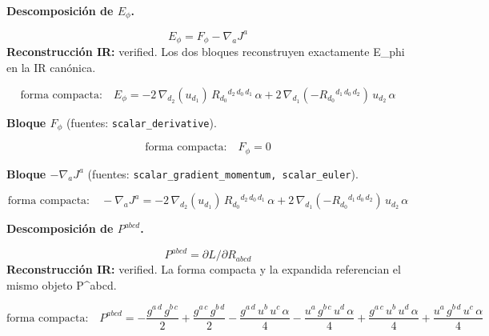 \documentclass[11pt]{article}
\begin{document}
\par\medskip\noindent\textbf{Descomposición de $ E_{\phi} $.}\par
\begin{dmath*}[breakdepth={5}]
E_{\phi}=F_{\phi}-\nabla_aJ^a
\end{dmath*}
\textbf{Reconstrucción IR:} verified. Los dos bloques reconstruyen exactamente E\_phi en la IR canónica.\par
\begin{dmath*}[breakdepth={5}]
\text{forma compacta:}\quad E_{\phi} = -2\,\nabla_{d_{2}}\!\left(u{}_{d_{1}}\right)\,R{}_{d_{0}}{}^{d_{2}\,d_{0}\,d_{1}}\,\alpha + 2\,\nabla_{d_{1}}\!\left(-R{}_{d_{0}}{}^{d_{1}\,d_{0}\,d_{2}}\right)\,u{}_{d_{2}}\,\alpha
\end{dmath*}
\par\smallskip\noindent\textbf{Bloque $ F_{\phi} $} (fuentes: \texttt{scalar\_derivative}).\par
\begin{dmath*}[breakdepth={5}]
\text{forma compacta:}\quad F_{\phi} = 0
\end{dmath*}
\par\smallskip\noindent\textbf{Bloque $ -\nabla_a J^a $} (fuentes: \texttt{scalar\_gradient\_momentum, scalar\_euler}).\par
\begin{dmath*}[breakdepth={5}]
\text{forma compacta:}\quad -\nabla_a J^a = -2\,\nabla_{d_{2}}\!\left(u{}_{d_{1}}\right)\,R{}_{d_{0}}{}^{d_{2}\,d_{0}\,d_{1}}\,\alpha + 2\,\nabla_{d_{1}}\!\left(-R{}_{d_{0}}{}^{d_{1}\,d_{0}\,d_{2}}\right)\,u{}_{d_{2}}\,\alpha
\end{dmath*}
\par\medskip\noindent\textbf{Descomposición de $ P^{abcd} $.}\par
\begin{dmath*}[breakdepth={5}]
P^{abcd}=\partial L/\partial R_{abcd}
\end{dmath*}
\textbf{Reconstrucción IR:} verified. La forma compacta y la expandida referencian el mismo objeto P^{abcd}.\par
\begin{dmath*}[breakdepth={5}]
\text{forma compacta:}\quad P^{abcd} = -\frac{g{}^{a\,d}\,g{}^{b\,c}}{2} + \frac{g{}^{a\,c}\,g{}^{b\,d}}{2} - \frac{g{}^{a\,d}\,u{}^{b}\,u{}^{c}\,\alpha}{4} - \frac{u{}^{a}\,g{}^{b\,c}\,u{}^{d}\,\alpha}{4} + \frac{g{}^{a\,c}\,u{}^{b}\,u{}^{d}\,\alpha}{4} + \frac{u{}^{a}\,g{}^{b\,d}\,u{}^{c}\,\alpha}{4}
\end{dmath*}
\end{document}
